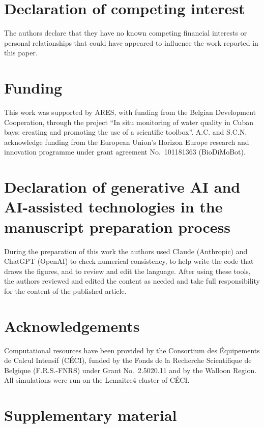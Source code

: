\documentclass[a4paper,fleqn]{ems-dc}
\begin{document}
\section*{Declaration of competing interest}
The authors declare that they have no known competing financial interests or personal
relationships that could have appeared to influence the work reported in this paper.

\section*{Funding}
This work was supported by ARES, with funding from the Belgian Development Cooperation,
through the project ``In situ monitoring of water quality in Cuban bays: creating and
promoting the use of a scientific toolbox''. A.C. and S.C.N. acknowledge funding from the
European Union's Horizon Europe research and innovation programme under grant agreement
No.~101181363 (BioDiMoBot).

\section*{Declaration of generative AI and AI-assisted technologies in the manuscript
preparation process}
During the preparation of this work the authors used Claude (Anthropic) and ChatGPT
(OpenAI) to check numerical consistency, to help write the code that draws the figures, and
to review and edit the language. After using these tools, the authors reviewed and edited
the content as needed and take full responsibility for the content of the published
article.

\section*{Acknowledgements}
Computational resources have been provided by the Consortium des \'Equipements de Calcul
Intensif (C\'ECI), \linebreak[1] funded by the Fonds de la Recherche Scientifique de Belgique
(F.R.S.-FNRS) under Grant No.\ 2.5020.11 and by the Walloon Region. All simulations
were run on the Lemaitre4 cluster of C\'ECI.

\printcredits




\clearpage
\onecolumn
\section*{Supplementary material}
\setcounter{figure}{0}
\renewcommand{\thefigure}{S\arabic{figure}}
\renewcommand{\theHfigure}{S\arabic{figure}}
\setcounter{table}{0}
\renewcommand{\thetable}{S\arabic{table}}
\renewcommand{\theHtable}{S\arabic{table}}
\end{document}
